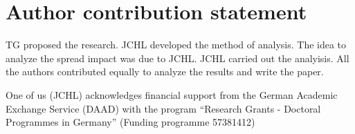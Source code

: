 \section{Author contribution statement}

TG proposed the research. JCHL developed the method of analysis. The idea to
analyze the spread impact was due to JCHL. JCHL carried out the analyisis. All
the authors contributed equally to analyze the results and write the paper.

\begin{acknowledgement}
    One of us (JCHL) acknowledges financial support from the German Academic
    Exchange Service (DAAD) with the program ``Research Grants - Doctoral
    Programmes in Germany'' (Funding programme 57381412)
\end{acknowledgement}
